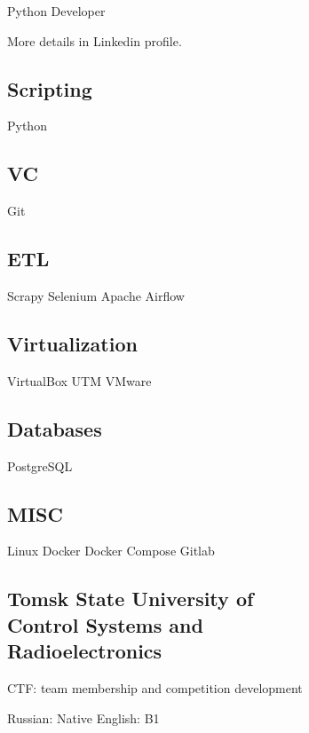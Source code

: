\documentclass[a4paper]{MagicalCV}
\begin{document}
\lastupdated


\begin{minipage}[t]{0.33\textwidth} 


Python Developer

More details in Linkedin profile.
\sectionsep




\sectionsep


\subsection{Scripting}
Python
\subsection{VC}
Git
\subsection{ETL}
Scrapy \textbullet{} Selenium \textbullet{} Apache Airflow
\subsection{Virtualization}
VirtualBox \textbullet{} UTM \textbullet{} VMware
\subsection{Databases}
PostgreSQL
\subsection{MISC}
Linux \textbullet{} Docker \textbullet{} Docker Compose
Gitlab


\subsection{Tomsk State University of \\ Control Systems and \\ Radioelectronics}
\vspace{\topsep} %
CTF: team membership and competition development
\sectionsep


Russian: Native 
English: B1
\sectionsep

\end{minipage} 
\end{document}
